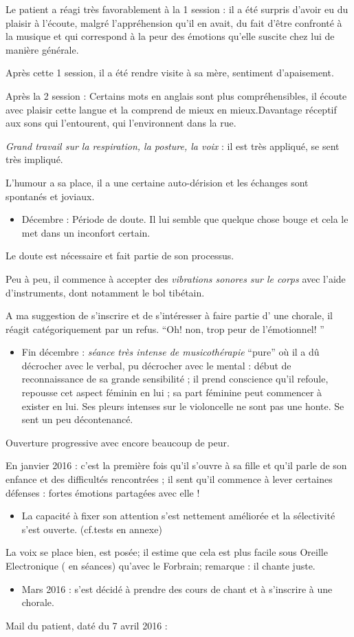 Le patient a réagi très favorablement à la 1\textdegree{} session
: il a été surpris d'avoir eu du plaisir à l'écoute, malgré l'appréhension
qu'il en avait, du fait d'être confronté à la musique et qui correspond
à la peur des émotions qu'elle suscite chez lui de manière générale.

Après cette 1\textdegree{} session, il a été rendre visite à sa mère,
sentiment d'apaisement.

Après la 2\textdegree{} session : Certains mots en anglais sont plus
compréhensibles, il écoute avec plaisir cette langue et la comprend
de mieux en mieux.Davantage réceptif aux sons qui l'entourent, qui
l'environnent dans la rue.

\emph{Grand travail sur la respiration, la posture, la voix }: il
est très appliqué, se sent très impliqué. 

L'humour a sa place, il a une certaine auto-dérision et les échanges
sont spontanés et joviaux.
\begin{itemize}
\item Décembre : Période de doute. Il lui semble que quelque chose bouge
et cela le met dans un inconfort certain.
\end{itemize}
Le doute est nécessaire et fait partie de son processus.

Peu à peu, il commence à accepter des\emph{ vibrations sonores sur
le corps} avec l'aide d'instruments, dont notamment le bol tibétain.

A ma suggestion de s'inscrire et de s'intéresser à faire partie d'
une chorale, il réagit catégoriquement par un refus. ``Oh! non, trop
peur de l'émotionnel! ''
\begin{itemize}
\item Fin décembre : \emph{séance très intense de musicothérapie }``pure''
où il a dû décrocher avec le verbal, pu décrocher avec le mental :
début de reconnaissance de sa grande sensibilité ; il prend conscience
qu'il refoule, repousse cet aspect féminin en lui ; sa part féminine
peut commencer à exister en lui. Ses pleurs intenses sur le violoncelle
ne sont pas une honte. Se sent un peu décontenancé.
\end{itemize}
Ouverture progressive avec encore beaucoup de peur.

En janvier 2016 : c'est la première fois qu'il s'ouvre à sa fille
et qu'il parle de son enfance et des difficultés rencontrées ; il
sent qu'il commence à lever certaines défenses : fortes émotions partagées
avec elle !
\begin{itemize}
\item La capacité à fixer son attention s'est nettement améliorée et la
sélectivité s'est ouverte. (cf.tests en annexe)
\end{itemize}
La voix se place bien, est posée; il estime que cela est plus facile
sous Oreille Electronique ( en séances) qu'avec le Forbrain; remarque
: il chante juste.
\begin{itemize}
\item Mars 2016 : s'est décidé à prendre des cours de chant et à s'inscrire
à une chorale.
\end{itemize}
Mail du patient, daté du 7 avril 2016 :

